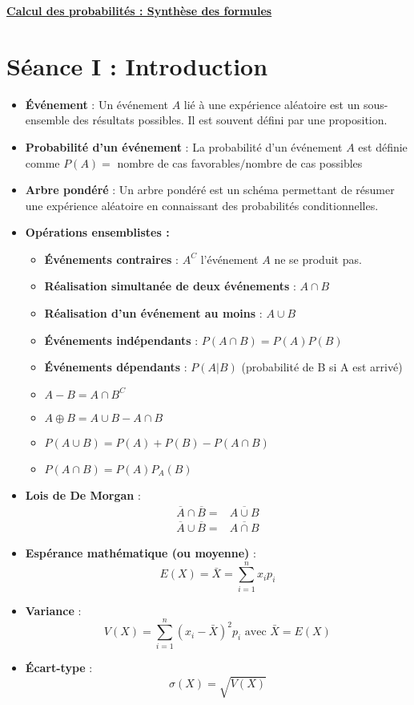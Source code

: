 \documentclass[a4paper,11pt]{report}
\begin{document}
\renewcommand{\labelitemi}{$\cdot$}
\renewcommand{\labelitemii}{$\diamond$}
\renewcommand{\labelitemiii}{$\cdot$}
\begin{Large}\begin{center}
   \underline{\textbf{Calcul des probabilités : Synthèse des formules}}
\end{center}\end{Large}

\section{Séance I : Introduction}
\begin{itemize}
	\item \textbf{Événement} : Un événement $A$ lié à une expérience aléatoire est un sous-ensemble des résultats possibles. Il est souvent défini par une proposition.
	\item \textbf{Probabilité d'un événement} : La probabilité d'un événement $A$ est définie comme $P(A)=$ nombre de cas favorables$/$nombre de cas possibles
	\item \textbf{Arbre pondéré} : Un arbre pondéré est un schéma permettant de résumer une expérience aléatoire en connaissant des probabilités conditionnelles.
	\item \textbf{Opérations ensemblistes :}
		\begin{itemize}
			\item \textbf{Événements contraires} : $A^C$ l'événement $A$ ne se produit pas.
			\item \textbf{Réalisation simultanée de deux événements} : $A \cap B$
			\item \textbf{Réalisation d'un événement au moins} : $A \cup B$
			\item \textbf{Événements indépendants} : $P(A \cap B) = P(A) P(B)$
			\item \textbf{Événements dépendants} : $P(A|B)$ (probabilité de B si A est arrivé)
			\item $A - B = A \cap B^C$
			\item $A \oplus B = A \cup B - A \cap B$
			\item $P(A \cup B) = P(A)+P(B)-P(A \cap B)$
			\item $P(A \cap B) = P(A)P_A(B)$
		\end{itemize}
	\item \textbf{Lois de De Morgan} :
		\begin{align*}
			\overline{A} \cap \overline{B} =& \overline{A \cup B} \\
			\overline{A} \cup \overline{B} =& \overline{A \cap B}
		\end{align*}
	\item \textbf{Espérance mathématique (ou moyenne)} :
		\[
			E(X)=\bar{X}=\sum\limits_{i=1}^{n}{x_ip_i}
		\]
	\item \textbf{Variance} :
		\[
			V(X)=\sum\limits_{i=1}^{n}{(x_i-\bar{X})^2p_i}
			\text{ avec }\bar{X} = E(X)
		\]
	\item \textbf{Écart-type} :
		\[
			\sigma(X) = \sqrt{V(X)}
		\]
\end{itemize}
\end{document}
